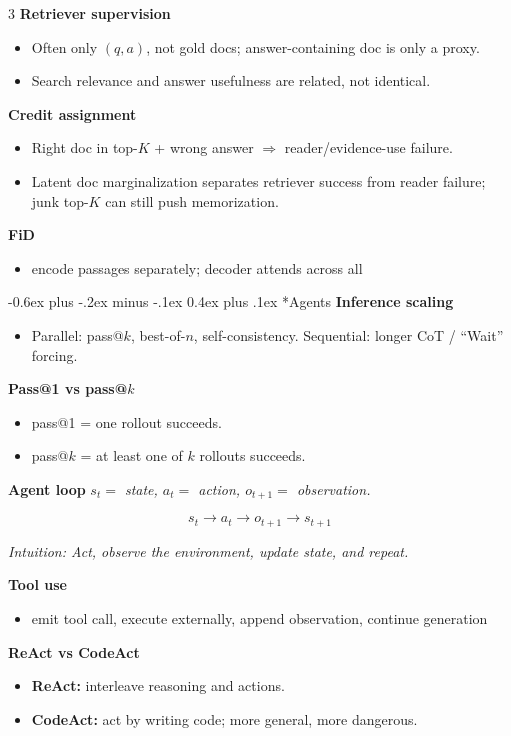 \documentclass[10pt,landscape]{article}
\makeatletter
\renewcommand{\section}{\@startsection{section}{1}{0mm}%
  {-0.6ex plus -.2ex minus -.1ex}%
  {0.4ex plus .1ex}%
  {\normalfont\normalsize\bfseries}}
\newcommand{\head}[1]{\section*{#1}}
\newcommand{\mini}[1]{\textbf{#1}}
\newcommand{\defs}[1]{{\emph{#1}}\par}
\newcommand{\intuition}[1]{{\scriptsize\emph{Intuition: #1}\par}}
\makeatother
\begin{document}
\begin{multicols}{3}
\mini{Retriever supervision}
\begin{itemize}
\item Often only \((q,a)\), not gold docs; answer-containing doc is only a proxy.
\item Search relevance and answer usefulness are related, not identical.
\end{itemize}

\mini{Credit assignment}
\begin{itemize}
\item Right doc in top-\(K\) + wrong answer \(\Rightarrow\) reader/evidence-use failure.
\item Latent doc marginalization separates retriever success from reader failure; junk top-\(K\) can still push memorization.
\end{itemize}

\mini{FiD}
\begin{itemize}
\item encode passages separately; decoder attends across all
\end{itemize}

\head{Agents}
\mini{Inference scaling}
\begin{itemize}
\item Parallel: pass@\(k\), best-of-\(n\), self-consistency. Sequential: longer CoT / ``Wait'' forcing.
\end{itemize}

\mini{Pass@1 vs pass@\(k\)}
\begin{itemize}
\item pass@1 = one rollout succeeds.
\item pass@\(k\) = at least one of \(k\) rollouts succeeds.
\end{itemize}

\mini{Agent loop}
\defs{\(s_t=\) state,\; \(a_t=\) action,\; \(o_{t+1}=\) observation.}
\[
s_t \to a_t \to o_{t+1} \to s_{t+1}
\]
\intuition{Act, observe the environment, update state, and repeat.}

\mini{Tool use}
\begin{itemize}
\item emit tool call, execute externally, append observation, continue generation
\end{itemize}

\mini{ReAct vs CodeAct}
\begin{itemize}
\item \textbf{ReAct:} interleave reasoning and actions.
\item \textbf{CodeAct:} act by writing code; more general, more dangerous.
\end{itemize}


\end{multicols}
\end{document}
